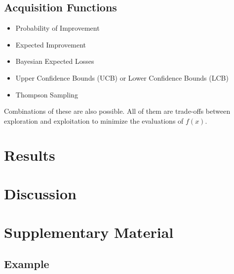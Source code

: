 \documentclass{article}
\begin{document}
\subsection{Acquisition Functions}
\begin{itemize}
    \item Probability of Improvement
    \item Expected Improvement
    \item Bayesian Expected Losses
    \item Upper Confidence Bounds (UCB) or Lower Confidence Bounds (LCB)
    \item Thompson Sampling
\end{itemize}
Combinations of these are also possible.
All of them are trade-offs between exploration and exploitation to minimize the evaluations of
$f(x)$.

\section{Results}
\label{section:results}

\section{Discussion}
\label{subsection:discussion}




\section{Supplementary Material}
\label{section:supplementary-material}

\subsection{Example}
\label{subsection:supplement-example}
\end{document}
